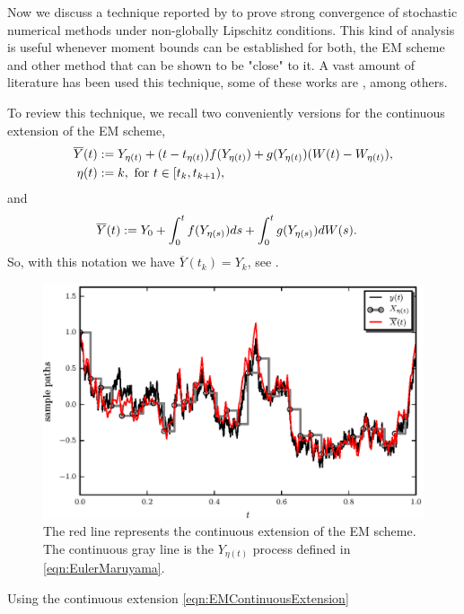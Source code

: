 	Now we discuss a technique  reported  by  \citet*{Higham2002b} to prove strong convergence 
of stochastic numerical methods under non-globally Lipschitz conditions.
This kind of analysis is useful whenever moment bounds can be established for both, the EM scheme and 
other method that can be shown to be "close" to it. A vast amount of literature has been used this 
technique, some of these works are
\cite{Beyn2010, Guo2014, Hutzenthaler2015, Hutzenthaler2012a,Hutzenthaler2010,Lamba2007,Mao2013,Tretyakov2013}, among
others.

	To review this technique, we recall two conveniently versions for the continuous extension of the EM 
scheme,
\begin{align}\label{eqn:EMContinuousExtension}
	\overline{Y}(t)&:=
		Y_{\eta(t)} + (t-t_{\eta(t)}) f(Y_{\eta(t)}) + g(Y_{\eta(t)})(W(t)-W_{\eta(t)}),\\
		\eta(t)&:=
			 k, \text{ for } t\in[t_k,t_{k+1}), \notag
\end{align}
and
\begin{align}
		\overline{Y}(t)
		&:=
			Y_0 + \int_{0}^t f(Y_{\eta(s)})ds + 
			\int_0^tg(Y_{\eta(s)})dW(s). \notag \label{eqn:EMIntegralContinuousExtension}
\end{align}
So, with this notation we have $\overline{Y}(t_k)=Y_k$, see .
%
\begin{figure}[h!]
	\centering
	\includegraphics{papers/paperB/sections/ContinuousExtPy/ContinuousExtension.eps}
	\caption{
		The red line represents the continuous extension of the EM scheme. The continuous gray line is the 
		$Y_{\eta(t)}$ 
		process defined in \eqref{eqn:EulerMaruyama}.
	}
	\label{fig:ContinuousExtension}
\end{figure}
Using the continuous extension \eqref{eqn:EMContinuousExtension}
